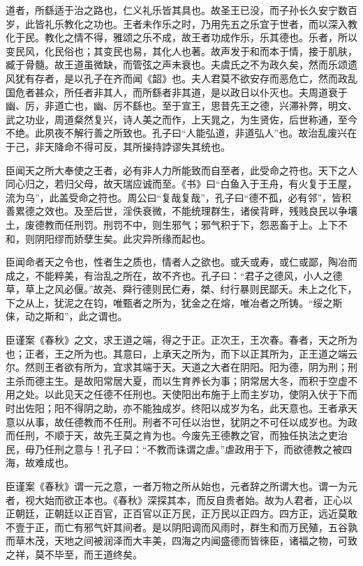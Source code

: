 \documentclass[12pt,UTF8]{ctexbook}
\begin{document}
道者，所繇适于治之路也，仁义礼乐皆其具也。故圣王已没，而子孙长久安宁数百岁，此皆礼乐教化之功也。王者未作乐之时，乃用先五之乐宜于世者，而以深入教化于民。教化之情不得，雅颂之乐不成，故王者功成作乐，乐其德也。乐者，所以变民风，化民俗也；其变民也易，其化人也著。故声发于和而本于情，接于肌肤，臧于骨髓。故王道虽微缺，而管弦之声未衰也。夫虞氏之不为政久矣，然而乐颂遗风犹有存者，是以孔子在齐而闻《韶》也。夫人君莫不欲安存而恶危亡，然而政乱国危者甚众，所任者非其人，而所繇者非其道，是以政日以仆灭也。夫周道衰于幽、厉，非道亡也，幽、厉不繇也。至于宣王，思昔先王之德，兴滞补弊，明文、武之功业，周道粲然复兴，诗人美之而作，上天晁之，为生贤佐，后世称通，至今不绝。此夙夜不解行善之所致也。孔子曰“人能弘道，非道弘人”也。故治乱废兴在于己，非天降命不得可反，其所操持誖谬失其统也。



臣闻天之所大奉使之王者，必有非人力所能致而自至者，此受命之符也。天下之人同心归之，若归父母，故天瑞应诚而至。《书》曰“白鱼入于王舟，有火复于王屋，流为乌”，此盖受命之符也。周公曰“复哉复哉”，孔子曰“德不孤，必有邻”，皆积善累德之效也。及至后世，淫佚衰微，不能统理群生，诸侯背畔，残贱良民以争壤土，废德教而任刑罚。刑罚不中，则生邪气；邪气积于下，怨恶畜于上。上下不和，则阴阳缪而娇孽生矣。此灾异所缘而起也。



臣闻命者天之令也，性者生之质也，情者人之欲也。或夭或寿，或仁或鄙，陶冶而成之，不能粹美，有治乱之所在，故不齐也。孔子曰：“君子之德风，小人之德草，草上之风必偃。”故尧、舜行德则民仁寿，桀、纣行暴则民鄙夭。未上之化下，下之从上，犹泥之在钧，唯甄者之所为，犹金之在熔，唯冶者之所铸。“绥之斯俫，动之斯和”，此之谓也。



臣谨案《春秋》之文，求王道之端，得之于正。正次王，王次春。春者，天之所为也；正者，王之所为也。其意曰，上承天之所为，而下以正其所为，正王道之端云尔。然则王者欲有所为，宜求其端于天。天道之大者在阴阳。阳为德，阴为刑；刑主杀而德主生。是故阳常居大夏，而以生育养长为事；阴常居大冬，而积于空虚不用之处。以此见天之任德不任刑也。天使阳出布施于上而主岁功，使阴入伏于下而时出佐阳；阳不得阴之助，亦不能独成岁。终阳以成岁为名，此天意也。王者承天意以从事，故任德教而不任刑。刑者不可任以治世，犹阴之不可任以成岁也。为政而任刑，不顺于天，故先王莫之肯为也。今废先王德教之官，而独任执法之吏治民，毋乃任刑之意与！孔子曰：“不教而诛谓之虐。”虐政用于下，而欲德教之被四海，故难成也。



臣谨案《春秋》谓一元之意，一者万物之所从始也，元者辞之所谓大也。谓一为元者，视大始而欲正本也。《春秋》深探其本，而反自贵者始。故为人君者，正心以正朝廷，正朝廷以正百官，正百官以正万民，正万民以正四方。四方正，远近莫敢不壹于正，而亡有邪气奸其间者。是以阴阳调而风雨时，群生和而万民殖，五谷孰而草木茂，天地之间被润泽而大丰美，四海之内闻盛德而皆徠臣，诸福之物，可致之祥，莫不毕至，而王道终矣。
\end{document}
